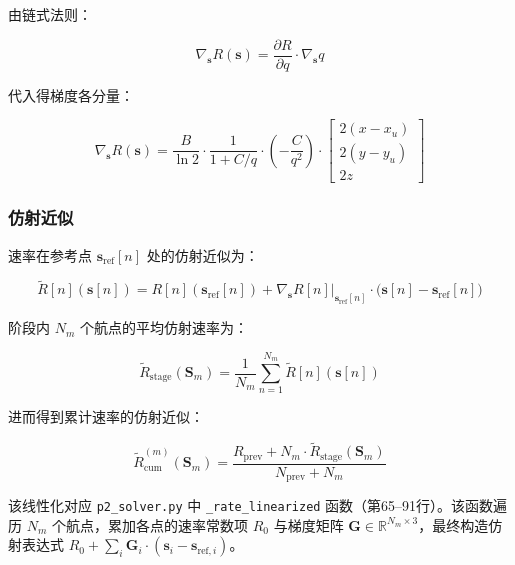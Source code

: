 由链式法则：

\begin{equation}
\nabla_{\mathbf{s}}R(\mathbf{s})=\frac{\partial R}{\partial q}\cdot\nabla_{\mathbf{s}}q
\label{eq:chain_rule}
\end{equation}

代入得梯度各分量：

\begin{equation}
\nabla_{\mathbf{s}}R(\mathbf{s})=
\frac{B}{\ln 2}\cdot\frac{1}{1+C/q}\cdot\left(-\frac{C}{q^2}\right)\cdot
\begin{bmatrix}2(x-x_u)\\2(y-y_u)\\2z\end{bmatrix}
\label{eq:gradient_R}
\end{equation}

\subsubsection{仿射近似}

速率在参考点 $\mathbf{s}_{\mathrm{ref}}[n]$ 处的仿射近似为：

\begin{equation}
\widetilde{R}[n](\mathbf{s}[n])=R[n](\mathbf{s}_{\mathrm{ref}}[n])+
\nabla_{\mathbf{s}}R[n]\big|_{\mathbf{s}_{\mathrm{ref}}[n]}\!\cdot\bigl(\mathbf{s}[n]-\mathbf{s}_{\mathrm{ref}}[n]\bigr)
\label{eq:rate_affine}
\end{equation}

阶段内 $N_m$ 个航点的平均仿射速率为：

\begin{equation}
\widetilde{R}_{\mathrm{stage}}(\mathbf{S}_m)=\frac{1}{N_m}\sum_{n=1}^{N_m}\widetilde{R}[n](\mathbf{s}[n])
\label{eq:stage_affine_rate}
\end{equation}

进而得到累计速率的仿射近似：

\begin{equation}
\widetilde{R}_{\mathrm{cum}}^{(m)}(\mathbf{S}_m)=
\frac{R_{\mathrm{prev}}+N_m\cdot\widetilde{R}_{\mathrm{stage}}(\mathbf{S}_m)}{N_{\mathrm{prev}}+N_m}
\label{eq:cum_affine_rate}
\end{equation}

该线性化对应 \texttt{p2\_solver.py} 中 \texttt{\_rate\_linearized} 函数（第65--91行）。该函数遍历 $N_m$ 个航点，累加各点的速率常数项 $R_0$ 与梯度矩阵 $\mathbf{G}\in\mathbb{R}^{N_m\times 3}$，最终构造仿射表达式 $R_0+\sum_{i}\mathbf{G}_i\cdot(\mathbf{s}_i-\mathbf{s}_{\mathrm{ref},i})$。


